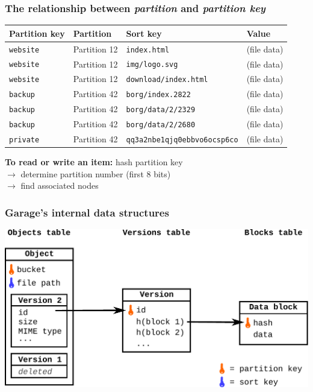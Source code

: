 \documentclass[aspectratio=169,xcolor={svgnames}]{beamer}
\begin{document}
\begin{frame}
	\frametitle{The relationship between \emph{partition} and \emph{partition key}}
	\begin{center}
	\begin{tabular}{|l|l|l|l|}
		\hline
		\textbf{Partition key} & \textbf{Partition} & \textbf{Sort key} & \textbf{Value} \\
		\hline
		\hline
		\texttt{website} & Partition 12 & \texttt{index.html} & (file data) \\
		\hline
		\texttt{website} & Partition 12 & \texttt{img/logo.svg} & (file data) \\
		\hline
		\texttt{website} & Partition 12 &\texttt{download/index.html} & (file data) \\
		\hline
		\hline
		\texttt{backup} & Partition 42 & \texttt{borg/index.2822} & (file data) \\
		\hline
		\texttt{backup} & Partition 42 & \texttt{borg/data/2/2329} & (file data) \\
		\hline
		\texttt{backup} & Partition 42 & \texttt{borg/data/2/2680} & (file data) \\
		\hline
		\hline
		\texttt{private} & Partition 42 & \texttt{qq3a2nbe1qjq0ebbvo6ocsp6co} & (file data) \\
		\hline
	\end{tabular}
	\end{center}
	\vspace{1em}
	\textbf{To read or write an item:} hash partition key
	\\ \hspace{5cm} $\to$ determine partition number (first 8 bits)
	\\ \hspace{5cm} $\to$ find associated nodes
\end{frame}

\begin{frame}
	\frametitle{Garage's internal data structures}
	\centering
	\includegraphics[width=.75\columnwidth]{../assets/garage_tables.pdf}
\end{frame}
\end{document}
